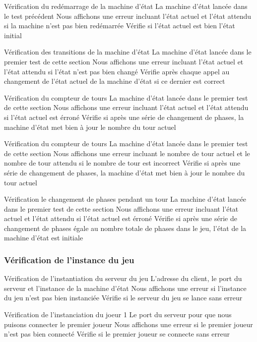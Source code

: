 \mytest
{Vérification du redémarrage de la machine d'état}
{La machine d'état lancée dans le test précédent}
{Nous affichons une erreur incluant l'état actuel et l'état attendu si la machine n'est pas bien redémarrée}
{Vérifie si l'état actuel est bien l'état initial}

\mytest
{Vérification des transitions de la machine d'état}
{La machine d'état lancée dans le premier test de cette section}
{Nous affichons une erreur incluant l'état actuel et l'état attendu si l'état n'est pas bien changé}
{Vérifie après chaque appel au changement de l'état actuel de la machine d'état si ce dernier est correct}

\mytest
{Vérification du compteur de tours}
{La machine d'état lancée dans le premier test de cette section}
{Nous affichons une erreur incluant l'état actuel et l'état attendu si l'état actuel est érroné}
{Vérifie si après une série de changement de phases, la machine d'état met bien à jour le nombre du tour actuel}

\mytest
{Vérification du compteur de tours}
{La machine d'état lancée dans le premier test de cette section}
{Nous affichons une erreur incluant le nombre de tour actuel et le nombre de tour attendu si le nombre de tour est incorrect}
{Vérifie si après une série de changement de phases, la machine d'état met bien à jour le nombre du tour actuel}

\mytest
{Vérification le changement de phases pendant un tour}
{La machine d'état lancée dans le premier test de cette section}
{Nous affichons une erreur incluant l'état actuel et l'état attendu si l'état actuel est érroné}
{Vérifie si après une série de changement de phases égale au nombre totale de phases dans le jeu, l'état de la machine d'état est initiale}

\subsubsection{Vérification de l'instance du jeu}

\mytest
{Vérification de l'instantiation du serveur du jeu}
{L'adresse du client, le port du serveur et l'instance de la machine d'état}
{Nous affichons une erreur si l'instance du jeu n'est pas bien instanciée}
{Vérifie si le serveur du jeu se lance sans erreur}

\mytest
{Vérification de l'instanciation du joeur 1}
{Le port du serveur pour que nous puisons connecter le premier joueur}
{Nous affichons une erreur si le premier joueur n'est pas bien connecté}
{Vérifie si le premier joueur se connecte sans erreur}

